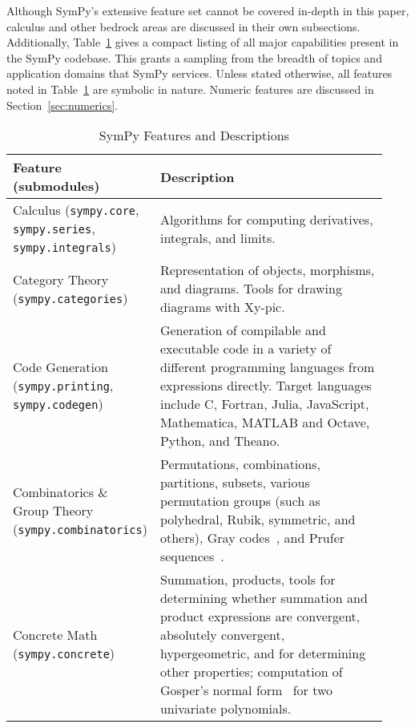 


Although SymPy's extensive feature set cannot be covered in-depth in this
paper, calculus and other bedrock areas are discussed in their own
subsections. Additionally, Table~\ref{features-table} gives a compact listing
of all major capabilities present in the SymPy codebase. This grants a
sampling from the breadth of topics and application domains that SymPy
services. Unless stated otherwise, all features noted in
Table~\ref{features-table} are symbolic in nature. Numeric features are
discussed in Section~\ref{sec:numerics}.

\begin{longtable}[htbc]{>{\raggedright}p{0.30\linewidth}p{0.63\linewidth}}
\caption{SymPy Features and Descriptions\label{features-table}}\\
\toprule
\textbf{Feature (submodules)} & \textbf{Description} \\
\midrule
Calculus (\texttt{sympy.core}, \texttt{sympy.series}, \texttt{sympy.integrals}) & Algorithms for computing derivatives, integrals, and limits.\\

Category Theory (\texttt{sympy.categories}) & Representation of objects, morphisms, and diagrams. Tools
for drawing diagrams with Xy-pic.\\

Code Generation (\texttt{sympy.printing}, \texttt{sympy.codegen}) & Generation of compilable and executable code in a
variety of different programming languages from expressions directly. Target
languages include C, Fortran, Julia, JavaScript,
Mathematica, MATLAB and Octave, Python, and Theano.\\

Combinatorics \& Group Theory (\texttt{sympy.combinatorics}) & Permutations, combinations,
partitions, subsets, various permutation groups (such as polyhedral, Rubik,
symmetric, and others), Gray codes~\cite{Nijenhuis1978combinatorial},
and Prufer sequences~\cite{biggs1976graph}.\\

Concrete Math (\texttt{sympy.concrete}) & Summation, products, tools for determining whether summation
and product expressions are convergent, absolutely convergent, hypergeometric,
and for determining other properties; computation of Gosper's normal form~\cite{petkovvsek1996bak} for two univariate polynomials.\\


\end{longtable}
